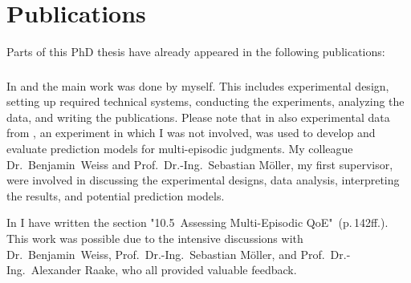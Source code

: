 \chapter*{Publications}
Parts of this PhD thesis have already appeared in the following publications:

\begin{refsection}
    \small
    \nocite{guse_macro-temporal_2013}
    \nocite{guse_modelling_2014}
    \nocite{weiss_temporal_2014}
    \printbibliography[heading=none]
\end{refsection}

\subsection*{}
In \citet{guse_macro-temporal_2013} and \citet{guse_modelling_2014} the main work was done by myself.
This includes experimental design, setting up required technical systems, conducting the experiments, analyzing the data, and writing the publications.
Please note that in \citet{guse_modelling_2014} also experimental data from \citet{moller_single-call_2011}, an experiment in which I was not involved, was used to develop and evaluate prediction models for multi-episodic judgments.
My colleague Dr.~Benjamin~Weiss and Prof.~Dr.-Ing.~Sebastian Möller, my first supervisor, were involved in discussing the experimental designs, data analysis, interpreting the results, and potential prediction models.

In \citet{weiss_temporal_2014} I have written the section "10.5~Assessing Multi-Episodic QoE"~(p.\,142ff.).
This work was possible due to the intensive discussions with Dr.~Benjamin~Weiss, Prof.~Dr.-Ing.~Sebastian Möller, and Prof.~Dr.-Ing.~Alexander Raake, who all provided valuable feedback.